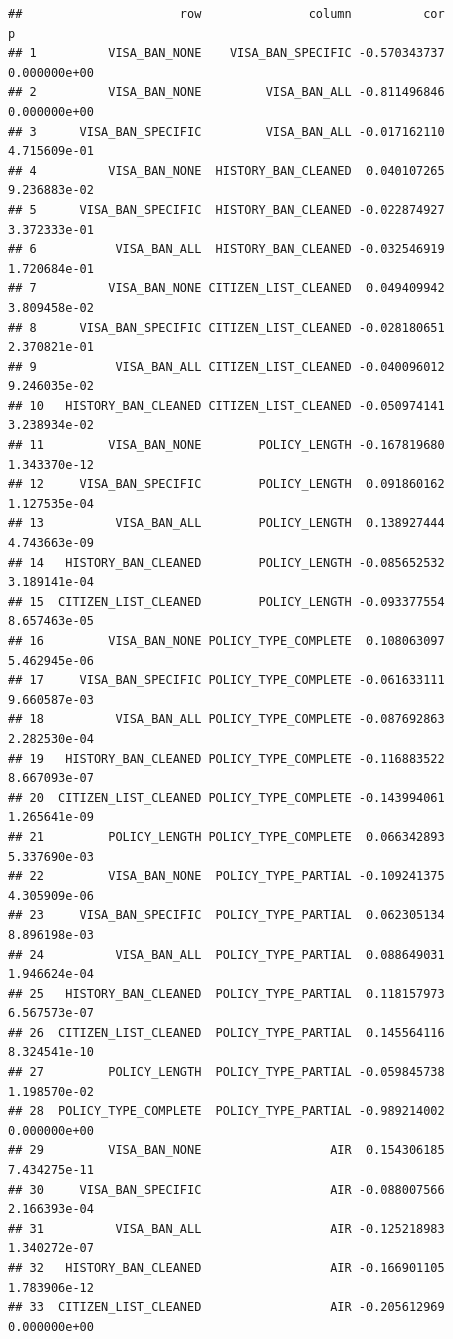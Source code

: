 \documentclass[]{article}
\begin{document}
\begin{verbatim}
##                      row               column          cor            p
## 1          VISA_BAN_NONE    VISA_BAN_SPECIFIC -0.570343737 0.000000e+00
## 2          VISA_BAN_NONE         VISA_BAN_ALL -0.811496846 0.000000e+00
## 3      VISA_BAN_SPECIFIC         VISA_BAN_ALL -0.017162110 4.715609e-01
## 4          VISA_BAN_NONE  HISTORY_BAN_CLEANED  0.040107265 9.236883e-02
## 5      VISA_BAN_SPECIFIC  HISTORY_BAN_CLEANED -0.022874927 3.372333e-01
## 6           VISA_BAN_ALL  HISTORY_BAN_CLEANED -0.032546919 1.720684e-01
## 7          VISA_BAN_NONE CITIZEN_LIST_CLEANED  0.049409942 3.809458e-02
## 8      VISA_BAN_SPECIFIC CITIZEN_LIST_CLEANED -0.028180651 2.370821e-01
## 9           VISA_BAN_ALL CITIZEN_LIST_CLEANED -0.040096012 9.246035e-02
## 10   HISTORY_BAN_CLEANED CITIZEN_LIST_CLEANED -0.050974141 3.238934e-02
## 11         VISA_BAN_NONE        POLICY_LENGTH -0.167819680 1.343370e-12
## 12     VISA_BAN_SPECIFIC        POLICY_LENGTH  0.091860162 1.127535e-04
## 13          VISA_BAN_ALL        POLICY_LENGTH  0.138927444 4.743663e-09
## 14   HISTORY_BAN_CLEANED        POLICY_LENGTH -0.085652532 3.189141e-04
## 15  CITIZEN_LIST_CLEANED        POLICY_LENGTH -0.093377554 8.657463e-05
## 16         VISA_BAN_NONE POLICY_TYPE_COMPLETE  0.108063097 5.462945e-06
## 17     VISA_BAN_SPECIFIC POLICY_TYPE_COMPLETE -0.061633111 9.660587e-03
## 18          VISA_BAN_ALL POLICY_TYPE_COMPLETE -0.087692863 2.282530e-04
## 19   HISTORY_BAN_CLEANED POLICY_TYPE_COMPLETE -0.116883522 8.667093e-07
## 20  CITIZEN_LIST_CLEANED POLICY_TYPE_COMPLETE -0.143994061 1.265641e-09
## 21         POLICY_LENGTH POLICY_TYPE_COMPLETE  0.066342893 5.337690e-03
## 22         VISA_BAN_NONE  POLICY_TYPE_PARTIAL -0.109241375 4.305909e-06
## 23     VISA_BAN_SPECIFIC  POLICY_TYPE_PARTIAL  0.062305134 8.896198e-03
## 24          VISA_BAN_ALL  POLICY_TYPE_PARTIAL  0.088649031 1.946624e-04
## 25   HISTORY_BAN_CLEANED  POLICY_TYPE_PARTIAL  0.118157973 6.567573e-07
## 26  CITIZEN_LIST_CLEANED  POLICY_TYPE_PARTIAL  0.145564116 8.324541e-10
## 27         POLICY_LENGTH  POLICY_TYPE_PARTIAL -0.059845738 1.198570e-02
## 28  POLICY_TYPE_COMPLETE  POLICY_TYPE_PARTIAL -0.989214002 0.000000e+00
## 29         VISA_BAN_NONE                  AIR  0.154306185 7.434275e-11
## 30     VISA_BAN_SPECIFIC                  AIR -0.088007566 2.166393e-04
## 31          VISA_BAN_ALL                  AIR -0.125218983 1.340272e-07
## 32   HISTORY_BAN_CLEANED                  AIR -0.166901105 1.783906e-12
## 33  CITIZEN_LIST_CLEANED                  AIR -0.205612969 0.000000e+00

\end{verbatim}
\end{document}
